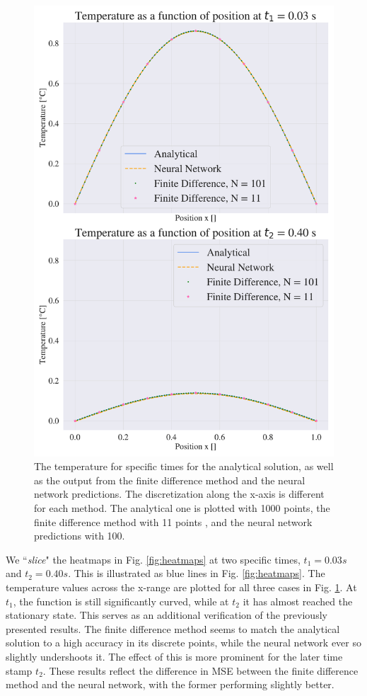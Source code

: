 \begin{figure}[h!]
    \centering
    \includegraphics[width=1.0\linewidth]{project_3/plots/time_slices_comparison.pdf}
    \caption{The temperature for specific times for the analytical solution, as well as the output from the finite difference method and the neural network predictions. The discretization along the x-axis is different for each method. The analytical one is plotted with 1000 points, the finite difference method with 11 points , and the neural network predictions with 100. }
    \label{fig:timeslices}
\end{figure}


We ``\textit{slice}" the heatmaps in Fig. \ref{fig:heatmaps} at two specific times, $t_1 = 0.03 s$ and $t_2 = 0.40 s$. 
This is illustrated as blue lines in Fig. \ref{fig:heatmaps}.
The temperature values across the x-range are plotted for all three cases in Fig. \ref{fig:timeslices}.
At $t_1$, the function is still significantly curved, while at $t_2$ it has almost reached the stationary state.
This serves as an additional verification of the previously presented results. 
The finite difference method seems to match the analytical solution to a high accuracy in its discrete points, while the neural network ever so slightly undershoots it.
The effect of this is more prominent for the later time stamp $t_2$. 
These results reflect the difference in MSE between the finite difference method and the neural network, with the former performing slightly better. 

